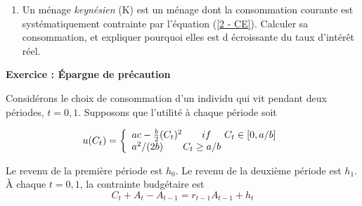 \documentclass[a4paper,11pt]{article}
\begin{document}
\begin{enumerate}

\item Un m\'{e}nage \textit{keyn\'{e}sien} (K) est un m\'{e}nage dont la
consommation courante est syst\'{e}matiquement contrainte par l'\'{e}quation
(\ref{2 - CE}). Calculer sa consommation, et expliquer pourquoi elles est d%
\'{e}croissante du taux d'int\'{e}r\^{e}t r\'{e}el.

\end{enumerate}


\noindent \textbf{Exercice : Épargne de précaution}


\bigskip


Considérons le choix de consommation d'un individu qui vit pendant deux périodes, $t=0,1$. Supposons que l'utilité 
à chaque période soit

\begin{equation}
u(C_t)=\left\{ 
\begin{array}{l}
ac -\frac{b}{2} (C_t)^2\text{\qquad  } if \  \ \ \ C_t \in [0,a/b ] \\ 
a^2/(2b) \text{\qquad } C_t \geq a/b  %
\end{array}%
\right.  \label{uti}
\end{equation}

Le revenu de la première période est $ h_0 $. Le revenu de la deuxième période est $ h_1 $. 
À chaque $ t = 0,1 $, la contrainte budgétaire est \begin{equation}
C_{t}+ A_{t}-A_{t-1}=r_{t-1}A_{t-1}  + h_t
\label{2 - CB}
\end{equation}%
\end{document}
